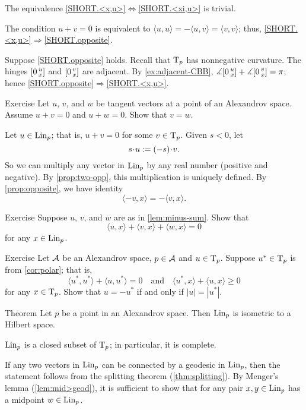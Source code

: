 The equivalence  \ref{SHORT.<x,u>}$\Leftrightarrow$\ref{SHORT.<xi,u>} is trivial.

The condition $u+v=0$ is equivalent to 
$\langle u,u\rangle =-\langle u,v\rangle =\langle v,v\rangle$;
thus,
\ref{SHORT.<x,u>}$\Rightarrow$\ref{SHORT.opposite}.

Suppose  \ref{SHORT.opposite} holds.
Recall that $\mathrm{T}_p$ has nonnegative curvature.
The hinges $[0\,{}^{u}_{x}]$ and $[0\,{}^{v}_{x}]$ are adjacent.
By \ref{ex:adjacent-CBB}, $\measuredangle[0\,{}^{u}_{x}]+\measuredangle[0\,{}^{v}_{x}]=\pi$;
hence \ref{SHORT.opposite}$\Rightarrow$\ref{SHORT.<x,u>}.
\qeds

\begin{thm}[!]{Exercise}\label{prop:two-opp}
Let $u$, $v$, and $w$ be tangent vectors at a point of an Alexandrov space.
Assume $u+v=0$ and $u+ w=0$.
Show that $v=w$.
\end{thm}

Let $u\in \mathop{\rm Lin}\nolimits_p$; that is, $u+v=0$ for some $v\in\mathrm{T}_p$.
Given $s<0$, let 
\[s\cdot u\df (-s)\cdot v.\]
So we can multiply any vector in $\mathop{\rm Lin}\nolimits_p$ by any real number (positive and negative).
By \ref{prop:two-opp}, this multiplication is uniquely defined.
By \ref{prop:opposite}, we have identity
\[\langle -v,x\rangle=-\langle v,x\rangle.\]


\begin{thm}[!]{Exercise}\label{ex:3<,>=0}
Suppose $u$, $v$, and $w$ are as in \ref{lem:minus-sum}.
Show that
\[\langle u,x\rangle +\langle v,x\rangle +\langle w,x\rangle = 0\]
for any $x\in \mathop{\rm Lin}\nolimits_p$.
\end{thm}

\begin{thm}[!]{Exercise}\label{ex:-u}
Let $\mathcal{A}$ be an Alexandrov space,
$p\in \mathcal{A}$ and $u\in \mathrm{T}_p$.
Suppose $u^*\in \mathrm{T}_p$ is from \ref{cor:polar};
that is, 
\[\langle u^*,u^*\rangle +\langle u,u^*\rangle = 0
\quad\text{and}\quad
\langle u^*,x\rangle +\langle u,x\rangle \ge 0
\]
for any $x\in \mathrm{T}_p$.
Show that $u=-u^*$ if and only if $|u|=|u^*|$.
\end{thm}

\begin{thm}{Theorem}\label{thm:lin-subcone}
Let $p$ be a point in an Alexandrov space. 
Then $\mathop{\rm Lin}\nolimits_p$ is isometric to a Hilbert space.
\end{thm}

$\mathop{\rm Lin}\nolimits_p$ is a closed subset of $\mathrm{T}_p$;
in particular, it is complete.

If any two vectors in $\mathop{\rm Lin}\nolimits_p$ can be connected by a geodesic in $\mathop{\rm Lin}\nolimits_p$,
then the statement follows from the splitting theorem (\ref{thm:splitting}).
By Menger's lemma (\ref{lem:mid>geod}), it is sufficient to show that for any pair $x,y\in\mathop{\rm Lin}\nolimits_p$
has a midpoint $w\in \mathop{\rm Lin}\nolimits_p$.

